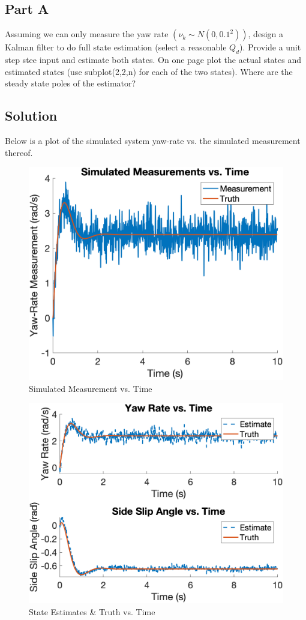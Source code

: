 \documentclass{article}
\begin{document}
\subsection*{Part A}
Assuming we can only measure the yaw rate $(\nu_k\sim N(0, 0.1^2))$, design a Kalman filter to do full state estimation (select a reasonable $Q_d$). Provide a unit step stee input and estimate both states.  On one page plot the actual states and estimated states (use subplot(2,2,n) for each of the two states). Where are the steady state poles of the estimator?
\subsection*{Solution}
Below is a plot of the simulated system yaw-rate vs. the simulated measurement thereof.
\begin{figure}[H]
    \centering
    \includegraphics[width=0.75\linewidth]{../figures/p4a_meas.png}
    \caption{Simulated Measurement vs. Time}\label{fig:p4a_meas}
\end{figure}
\begin{figure}[H]
    \centering
    \includegraphics[width=0.75\linewidth]{../figures/p4a_kf.png}
    \caption{State Estimates \& Truth vs. Time}\label{fig:p4a_kf}
\end{figure}
\end{document}
